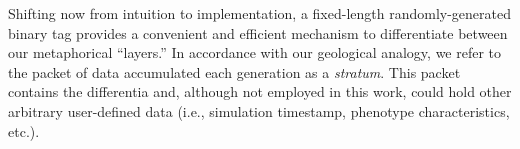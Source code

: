 Shifting now from intuition to implementation, a fixed-length randomly-generated binary tag provides a convenient and efficient mechanism to differentiate between our metaphorical ``layers.''
%
In accordance with our geological analogy, we refer to the packet of data accumulated each generation as a \textit{stratum}.
This packet contains the differentia and, although not employed in this work, could hold other arbitrary user-defined data (i.e., simulation timestamp, phenotype characteristics, etc.).


% 

